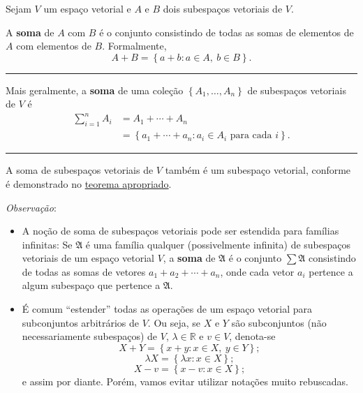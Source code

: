 \begin{definition}
	Sejam $V$ um espaço vetorial e $A$ e $B$ dois subespaços vetoriais de $V$.
	
	A \textbf{soma} de $A$ com $B$ é o conjunto consistindo de todas as somas de elementos de $A$ com elementos de $B$. Formalmente,
	\[A+B=\left\{a+b:a\in A,\ b\in B\right\}.\]
	
	\hrule
	
	Mais geralmente, a \textbf{soma} de uma coleção $\left\{A_1,\ldots,A_n\right\}$ de subespaços vetoriais de $V$ é
	\begin{align*}
		\sum_{i=1}^n A_i&=A_1+\cdots+A_n\\
		&=\left\{a_1+\cdots+a_n:a_i\in A_i\text{ para cada }i\right\}.
		\end{align*}
	\hrule
	
	A soma de subespaços vetoriais de $V$ também é um subespaço vetorial, conforme é demonstrado no \href{http://mtm.ufsc.br/~cordeiro/ensino/mtm3112.algebra.linear/03.somas/teo_soma_e_subespaco_moodle.html}{teorema apropriado}.
\end{definition}

\emph{Observação}:
\begin{itemize}
	\item A noção de soma de subespaços vetoriais pode ser estendida para famílias infinitas: Se $\mathfrak{A}$ é uma família qualquer (possivelmente infinita) de subespaços vetoriais de um espaço vetorial $V$, a \textbf{soma} de $\mathfrak{A}$ é o conjunto $\sum\mathfrak{A}$ consistindo de todas as somas de vetores $a_1+a_2+\cdots+a_n$, onde cada vetor $a_i$ pertence a algum subespaço que pertence a $\mathfrak{A}$.
	\item É comum ``estender'' todas as operações de um espaço vetorial para subconjuntos arbitrários de $V$. Ou seja, se $X$ e $Y$ são subconjuntos (não necessariamente subespaços) de $V$, $\lambda\in\mathbb{R}$ e $v\in V$, denota-se
\[X+Y=\left\{x+y:x\in X,\ y\in Y\right\};\]
\[\lambda X=\left\{\lambda x:x\in X\right\};\]
\[X-v=\left\{x-v:x\in X\right\};\]
e assim por diante. Porém, vamos evitar utilizar notações muito rebuscadas.
\end{itemize}